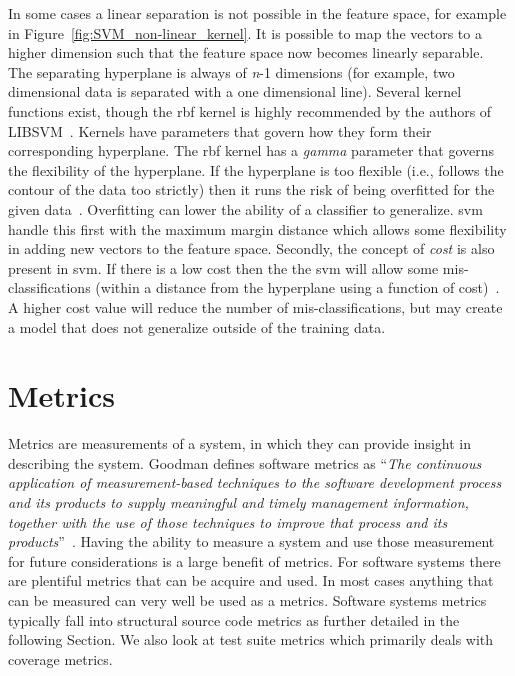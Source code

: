 In some cases a linear separation is not possible in the feature space, for example in Figure~\ref{fig:SVM_non-linear_kernel}. It is possible to map the vectors to a higher dimension such that the feature space now becomes linearly separable. The separating hyperplane is always of \emph{n}-1 dimensions (for example, two dimensional data is separated with a one dimensional line). Several kernel functions exist, though the \gls{rbf} kernel is highly recommended by the authors of LIBSVM~\cite{HCL03}. Kernels have parameters that govern how they form their corresponding hyperplane. The \gls{rbf} kernel has a \emph{gamma} parameter that governs the flexibility of the hyperplane. If the hyperplane is too flexible (i.e., follows the contour of the data too strictly) then it runs the risk of being overfitted for the given data~\cite{BW10}. Overfitting can lower the ability of a classifier to generalize. \gls{svm} handle this first with the maximum margin distance which allows some flexibility in adding new vectors to the feature space. Secondly, the concept of \emph{cost} is also present in \gls{svm}. If there is a low cost then the the \gls{svm} will allow some mis-classifications (within a distance from the hyperplane using a function of cost)~\cite{BW10}. A higher cost value will reduce the number of mis-classifications, but may create a model that does not generalize outside of the training data.



\section{Metrics}
\label{sec:background_metrics}
Metrics are measurements of a system, in which they can provide insight in describing the system. Goodman defines software metrics as ``\emph{The continuous application of measurement-based techniques to the software development process and its products to supply meaningful and timely management information, together with the use of those techniques to improve that process and its products}''~\cite{Goo93}. Having the ability to measure a system and use those measurement for future considerations is a large benefit of metrics. For software systems there are plentiful metrics that can be acquire and used. In most cases anything that can be measured can very well be used as a metrics. Software systems metrics typically fall into structural source code metrics as further detailed in the following Section. We also look at test suite metrics which primarily deals with coverage metrics.


